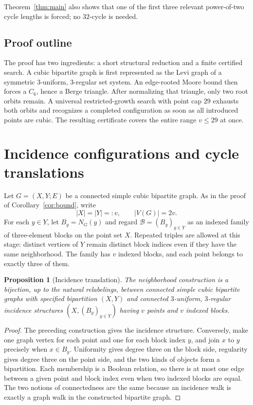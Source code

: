 \documentclass[11pt]{article}
\newtheorem{proposition}[theorem]{Proposition}
\theoremstyle{definition}
\newcommand{\cB}{\mathcal{B}}
\begin{document}
Theorem~\ref{thm:main} also shows that one of the first three relevant
power-of-two cycle lengths is forced; no \(32\)-cycle is needed.

\subsection{Proof outline}

The proof has two ingredients: a short structural reduction and a finite
certified search. A cubic bipartite graph is first represented as the Levi
graph of a symmetric \(3\)-uniform, \(3\)-regular set system. An edge-rooted
Moore bound then forces a \(C_6\), hence a Berge triangle. After normalizing
that triangle, only two root orbits remain. A universal restricted-growth
search with point cap \(29\) exhausts both orbits and recognizes a completed
configuration as soon as all introduced points are cubic. The resulting
certificate covers the entire range \(v\leq29\) at once.

\section{Incidence configurations and cycle translations}

Let \(G=(X,Y;E)\) be a connected simple cubic bipartite graph.  As in the
proof of Corollary~\ref{cor:bound}, write
\[
  |X|=|Y|=:v,\qquad |V(G)|=2v.
\]
For each \(y\in Y\), let \(B_y=N_G(y)\) and regard
\(\cB=(B_y)_{y\in Y}\) as an indexed family of three-element blocks on the
point set \(X\).  Repeated triples are allowed at this stage: distinct
vertices of \(Y\) remain distinct block indices even if they have the same
neighborhood.  The family has \(v\) indexed blocks, and each point belongs to
exactly three of them.

\begin{proposition}[Incidence translation]\label{prop:incidence}
The neighborhood construction is a bijection, up to the natural relabelings,
between connected simple cubic bipartite graphs with specified bipartition
\((X,Y)\) and connected \(3\)-uniform, \(3\)-regular incidence structures
\((X,(B_y)_{y\in Y})\) having \(v\) points and \(v\) indexed blocks.
\end{proposition}

\begin{proof}
The preceding construction gives the incidence structure.  Conversely, make
one graph vertex for each point and one for each block index \(y\), and join
\(x\) to \(y\) precisely when \(x\in B_y\).  Uniformity gives degree three on
the block side, regularity gives degree three on the point side, and the two
kinds of objects form a bipartition.  Each membership is a Boolean relation,
so there is at most one edge between a given point and block index even when
two indexed blocks are equal.  The two notions of connectedness are the same
because an incidence walk is exactly a graph walk in the constructed
bipartite graph.
\end{proof}
\end{document}
